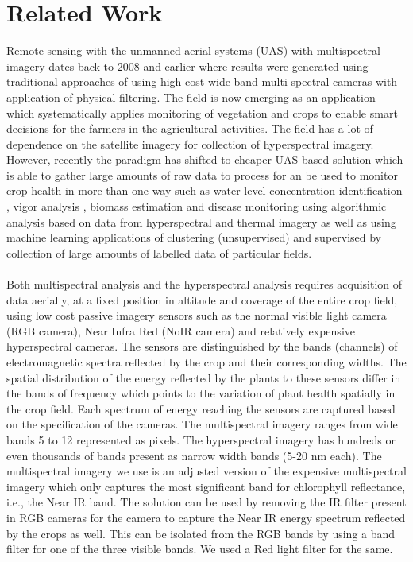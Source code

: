 \chapter{Related Work}
Remote sensing \cite{two} with the unmanned aerial systems (UAS) with multispectral imagery dates back to 2008 \cite{eight-icuas} and earlier where results were generated using traditional approaches of using high cost wide band multi-spectral cameras with application of physical filtering. The field is now emerging as an application which systematically applies monitoring of vegetation and crops to enable smart decisions for the farmers in the agricultural activities. The field has a  lot of dependence on the satellite imagery for collection of hyperspectral imagery. However, recently the paradigm has shifted to cheaper UAS based solution which is able to gather large amounts of raw data to process for an be used to monitor crop health in more than one way such as water level concentration identification \cite{two-remotev2}, vigor analysis \cite{three-remotev2}, biomass estimation and disease monitoring using algorithmic analysis based on data from hyperspectral and thermal imagery as well as using machine learning applications of clustering (unsupervised) and supervised by collection of large amounts of labelled data of particular fields.  
\\
\\
Both multispectral analysis and the hyperspectral analysis requires acquisition of data aerially, at a fixed position in altitude and coverage of the entire crop field, using low cost passive imagery sensors such as the normal visible light camera (RGB camera), Near Infra Red (NoIR camera) and relatively expensive hyperspectral cameras. The sensors are distinguished by the bands (channels) of electromagnetic spectra reflected by the crop and their corresponding widths. The spatial distribution of the energy reflected by the plants to these sensors differ in the bands of frequency which points to the variation of plant health spatially in the crop field. Each spectrum of energy reaching the sensors are captured based on the specification of the cameras. The multispectral imagery ranges from wide bands 5 to 12 represented as pixels. The hyperspectral imagery has hundreds or even thousands of bands present as narrow width bands (5-20 nm each). The multispectral imagery we use is an adjusted version of the expensive multispectral imagery which only captures the most significant band for chlorophyll reflectance, i.e., the Near IR band. The solution can be used by removing the IR filter present in RGB cameras for the camera to capture the Near IR energy spectrum reflected by the crops as well. This can be isolated from the RGB bands by using a band filter for one of the three visible bands. We used a Red light filter for the same.
